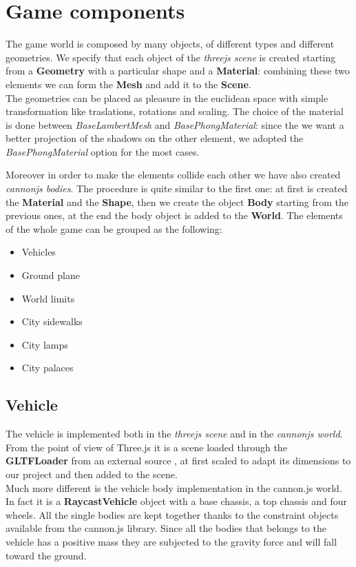 \documentclass[a4paper, 11pt, titlepage]{report}
\begin{document}
\chapter{Game components}
	\par The game world is composed by many objects, of different types and different geometries. 
	We specify that each object of the \emph{threejs scene} is created starting from a \textbf{Geometry} with a particular shape and a \textbf{Material}: combining these two elements we can form the \textbf{Mesh} and add it to the \textbf{Scene}. \\
	The geometries can be placed as pleasure in the euclidean space with simple transformation like traslations, rotations and scaling. The choice of the material is done between \emph{BaseLambertMesh} and \emph{BasePhongMaterial}: since the we want a better projection of the shadows on the other element, we adopted the \emph{BasePhongMaterial} option for the most cases.
	\par Moreover in order to make the elements collide each other we have also created \emph{cannonjs bodies}. The procedure is quite similar to the first one: at first is created the \textbf{Material} and the \textbf{Shape}, then we create the object \textbf{Body} starting from the previous ones, at the end the body object is added to the \textbf{World}.
	The elements of the whole game can be grouped as the following: 
	\begin{itemize}
		\setlength\itemsep{0.25em}
		\item Vehicles
		\item Ground plane
		\item World limits
		\item City sidewalks
		\item City lamps
		\item City palaces
	\end{itemize}  
	\section{Vehicle}
		\par The vehicle is implemented both in the \emph{threejs scene} and in the \emph{cannonjs world}. From the point of view of Three.js it is a scene loaded through the \textbf{GLTFLoader} from an external source \cite{vehiclesite}, at first scaled to adapt its dimensions to our project and then added to the scene. \\
		Much more different is the vehicle body implementation in the cannon.js world. In fact it is a \textbf{RaycastVehicle} object with a base chassis, a top chassis and four wheels. All the single bodies are kept together thanks to the constraint objects available from the cannon.js library. Since all the bodies that belongs to the vehicle has a positive mass they are subjected to the gravity force and will fall toward the ground.
\end{document}
